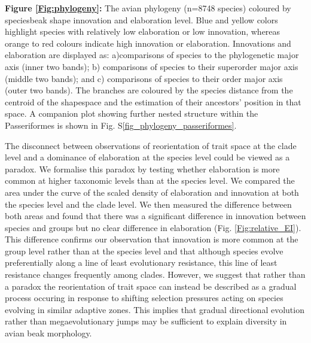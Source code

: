 \documentclass[12pt,letterpaper]{article}
\begin{document}
\bigskip

\noindent \textbf{Figure \ref{Fig:phylogeny}:} The avian phylogeny (n=8748 species) coloured by speciesbeak shape innovation and elaboration level.
Blue and yellow colors highlight species with relatively low elaboration or low innovation, whereas orange to red colours indicate high innovation or elaboration.
Innovations and elaboration are displayed as: a)comparisons of species to the phylogenetic major axis (inner two bands); b) comparisons of species to their superorder major axis (middle two bands); and c) comparisons of species to their order major axis (outer two bands).
The branches are coloured by the species distance from the centroid of the shapespace and the estimation of their ancestors' position in that space.
A companion plot showing further nested structure within the Passeriformes is shown in Fig. S\ref{fig_phylogeny_passeriformes}.

\bigskip

The disconnect between observations of reorientation of trait space at the clade level and a dominance of elaboration at the species level could be viewed as a paradox.
We formalise this paradox by testing whether elaboration is more common at higher taxonomic levels than at the species level.
We compared the area under the curve of the scaled density of elaboration and innovation at both the species level and the clade level.
We then measured the difference between both areas and found that there was a significant difference in innovation between species and groups but no clear difference in elaboration (Fig. \ref{Fig:relative_EI}).
This difference confirms our observation that innovation is more common at the group level rather than at the species level and that although species evolve preferentially along a line of least evolutionary resistance, this line of least resistance changes frequently among clades.
However, we suggest that rather than a paradox the reorientation of trait space can instead be described as a gradual process occuring in response to shifting selection pressures acting on species evolving in similar adaptive zones.
This implies that gradual directional evolution \cite{pagel2022general} rather than megaevolutionary jumps \cite{cooney2017mega,venditti2011multiple} may be sufficient to explain diversity in avian beak morphology.
\end{document}
